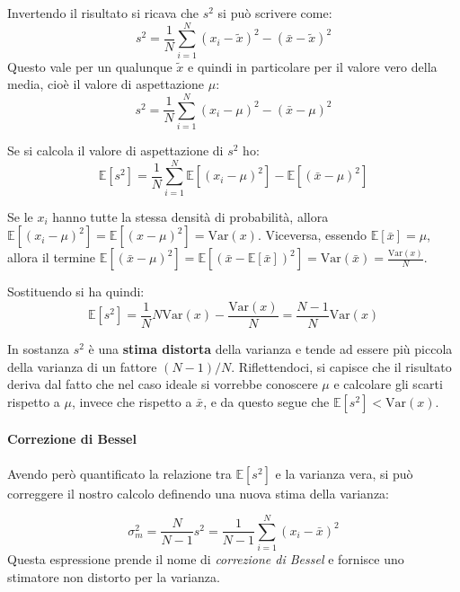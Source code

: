 \documentclass[openany,a4paper,12pt]{book}
\theoremstyle{remark}
\begin{document}
Invertendo il risultato si ricava che $s^2$ si può scrivere come:
\begin{equation}
s^2 = \frac{1}{N} \sum_{i=1}^N (x_i - \tilde{x})^2 - (\bar{x} - \tilde{x})^2
\end{equation}
Questo vale per un qualunque $\tilde{x}$ e quindi in particolare per il valore vero della media, cioè il valore di aspettazione $\mu$:
\begin{equation}
s^2 = \frac{1}{N} \sum_{i=1}^N (x_i - \mu)^2 - (\bar{x} - \mu)^2
\end{equation}

Se si calcola il valore di aspettazione di $s^2$ ho:
\begin{equation}
\mathbb{E}[s^2] = \frac{1}{N} \sum_{i=1}^N \mathbb{E}\left[(x_i - \mu)^2\right] - \mathbb{E}\left[(\bar{x} - \mu)^2\right]
\end{equation}

Se le $x_i$ hanno tutte la stessa densità di probabilità, allora $\mathbb{E}[(x_i - \mu)^2] = \mathbb{E}[(x - \mu)^2] = \text{Var}(x)$. Viceversa, essendo $\mathbb{E}[\bar{x}] = \mu$, allora il termine $\mathbb{E}[(\bar{x} - \mu)^2] = \mathbb{E}[(\bar{x} - \mathbb{E}[\bar{x}])^2] = \text{Var}(\bar{x}) = \frac{\text{Var}(x)}{N}$.

Sostituendo si ha quindi:
\begin{equation}
\mathbb{E}[s^2] = \frac{1}{N} N \text{Var}(x) - \frac{\text{Var}(x)}{N} = \frac{N-1}{N} \text{Var}(x)
\end{equation}

In sostanza $s^2$ è una \textbf{stima distorta} della varianza e tende ad essere più piccola della varianza di un fattore $(N-1)/N$.
Riflettendoci, si capisce che il risultato deriva dal fatto che nel caso ideale si vorrebbe conoscere $\mu$ e calcolare gli scarti rispetto a $\mu$, invece che rispetto a $\bar{x}$, e da questo segue che $\mathbb{E}[s^2] < \text{Var}(x)$.

\paragraph{Correzione di Bessel}
Avendo però quantificato la relazione tra $\mathbb{E}[s^2]$ e la varianza vera, si può correggere il nostro calcolo definendo una nuova stima della varianza:


\begin{equation}
\sigma_m^2 = \frac{N}{N-1} s^2 = \frac{1}{N-1} \sum_{i=1}^N (x_i - \bar{x})^2
\end{equation}
Questa espressione prende il nome di \emph{correzione di Bessel} e fornisce uno stimatore non distorto per la varianza.
\end{document}
